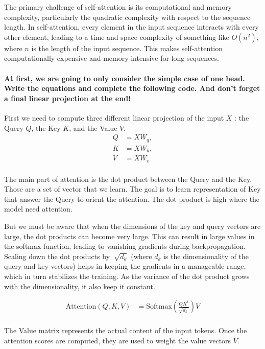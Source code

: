 \documentclass{article}
\theoremstyle{plain}%
\theoremstyle{definition}
\theoremstyle{remark}
\begin{document}
The primary challenge of self-attention is its computational and memory complexity, particularly the quadratic complexity with respect to the sequence length. In self-attention, every element in the input sequence interacts with every other element, leading to a time and space complexity of something like $ O(n^2) $, where $n$ is the length of the input sequence. This makes self-attention computationally expensive and memory-intensive for long sequences.

\paragraph{At first, we are going to only consider the simple case of one head. Write the equations and complete the following code. And don't forget a final linear projection at the end!}

First we need to compute three different linear projection of the input $ X $ : the Query $ Q $, the Key $ K $, and the Value $ V $.
\begin{align*}
    Q &= X W_q, \\
    K &= X W_k, \\
    V &= X W_v  \\
\end{align*}


The main part of attention is the dot product between the Query and the Key. Those are a set of vector that we learn. The goal is to learn representation of Key that answer the Query to orient the attention. The dot product is high where the model need attention. 

But we must be aware that when the dimensions of the key and query vectors are large, the dot products can become very large. This can result in large values in the softmax function, leading to vanishing gradients during backpropagation. Scaling down the dot products by $ \sqrt[]{d_k} $ (where $ d_k $  is the dimensionality of the query and key vectors) helps in keeping the gradients in a manageable range, which in turn stabilizes the training. As the variance of the dot product grows with the dimensionality, it also keep it constant.

\begin{align*}
    \text{Attention}(Q, K, V) &= \text{Softmax}\left(\frac{QK^t}{\sqrt{d_k}}\right)V \\
\end{align*}

The Value matrix represents the actual content of the input tokens. Once the attention scores are computed, they are used to weight the value vectors $ V $.
\end{document}
